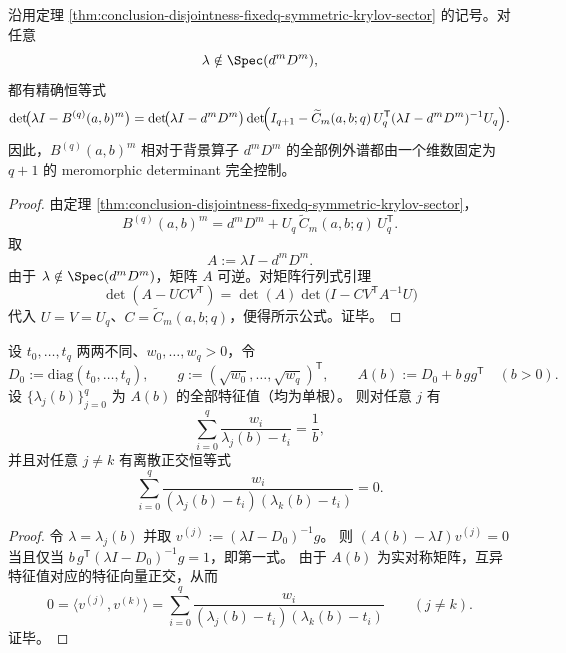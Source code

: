 \begin{corollary}\label{cor:conclusion-disjointness-fixedq-meromorphic-determinant-certificate}
沿用定理 \ref{thm:conclusion-disjointness-fixedq-symmetric-krylov-sector} 的记号。对任意
\[
\lambda\notin \Spec(d^mD^m),
\]
都有精确恒等式
\[
\det\!\bigl(\lambda I-B^{(q)}(a,b)^m\bigr)
=
\det\!\bigl(\lambda I-d^mD^m\bigr)
\det\!\Bigl(
I_{q+1}-\widetilde C_m(a,b;q)\,U_q^{\mathsf T}(\lambda I-d^mD^m)^{-1}U_q
\Bigr).
\]
因此，\(B^{(q)}(a,b)^m\) 相对于背景算子 \(d^mD^m\) 的全部例外谱都由一个维数固定为 \(q+1\) 的 meromorphic determinant 完全控制。
\end{corollary}
\begin{proof}
由定理 \ref{thm:conclusion-disjointness-fixedq-symmetric-krylov-sector}，
\[
B^{(q)}(a,b)^m=d^mD^m+U_q\,\widetilde C_m(a,b;q)\,U_q^{\mathsf T}.
\]
取
\[
A:=\lambda I-d^mD^m.
\]
由于 \(\lambda\notin \Spec(d^mD^m)\)，矩阵 \(A\) 可逆。对矩阵行列式引理
\[
\det(A-UCV^{\mathsf T})
=
\det(A)\det\!\bigl(I-CV^{\mathsf T}A^{-1}U\bigr)
\]
代入 \(U=V=U_q\)、\(C=\widetilde C_m(a,b;q)\)，便得所示公式。证毕。
\end{proof}

\begin{proposition}\label{prop:conclusion-rankone-cauchy-orthogonality}
设 \(t_0,\dots,t_q\) 两两不同、\(w_0,\dots,w_q>0\)，令
\[
D_0:=\mathrm{diag}(t_0,\dots,t_q),\qquad g:=(\sqrt{w_0},\dots,\sqrt{w_q})^{\mathsf T},
\qquad A(b):=D_0+b\,gg^{\mathsf T}\quad(b>0).
\]
设 \(\{\lambda_j(b)\}_{j=0}^{q}\) 为 \(A(b)\) 的全部特征值（均为单根）。
则对任意 \(j\) 有
\[
\sum_{i=0}^{q}\frac{w_i}{\lambda_j(b)-t_i}=\frac1b,
\]
并且对任意 \(j\ne k\) 有离散正交恒等式
\[
\sum_{i=0}^{q}\frac{w_i}{(\lambda_j(b)-t_i)(\lambda_k(b)-t_i)}=0.
\]
\end{proposition}
\begin{proof}
令 \(\lambda=\lambda_j(b)\) 并取 \(v^{(j)}:=(\lambda I-D_0)^{-1}g\)。
则 \((A(b)-\lambda I)v^{(j)}=0\) 当且仅当
\(
b\,g^{\mathsf T}(\lambda I-D_0)^{-1}g=1
\)，即第一式。
由于 \(A(b)\) 为实对称矩阵，互异特征值对应的特征向量正交，从而
\[
0=\langle v^{(j)},v^{(k)}\rangle=\sum_{i=0}^{q}\frac{w_i}{(\lambda_j(b)-t_i)(\lambda_k(b)-t_i)}\qquad(j\ne k).
\]
证毕。
\end{proof}

